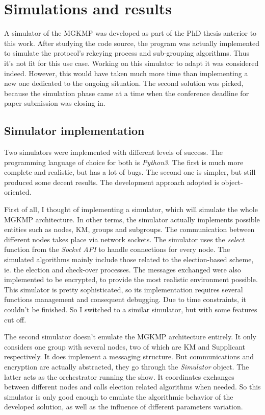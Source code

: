 \section{Simulations and results}
\label{sec:simulations_results}

A simulator of the MGKMP was developed as part of the PhD thesis \cite{kandi_lightweight_nodate} anterior to this work. After studying the code source, the program was actually implemented to simulate the protocol's rekeying process and sub-grouping algorithms. Thus it's not fit for this use case. Working on this simulator to adapt it was considered indeed. However, this would have taken much more time than implementing a new one dedicated to the ongoing situation. The second solution was picked, because the simulation phase came at a time when the conference deadline for paper submission was closing in.

\subsection{Simulator implementation}

Two simulators were implemented with different levels of success. The programming language of choice for both is \emph{Python3}. The first is much more complete and realistic, but has a lot of bugs. The second one is simpler, but still produced some decent results. The development approach adopted is object-oriented.

First of all, I thought of implementing a simulator, which will simulate the whole MGKMP architecture. In other terms, the simulator actually implements possible entities such as nodes, KM, groups and subgroups. The communication between different nodes takes place via network sockets. The simulator uses the \emph{select} function from the \emph{Socket API} to handle connections for every node. The simulated algorithms mainly include those related to the election-based scheme, ie. the election and  check-over processes. The messages exchanged were also implemented to be encrypted, to provide the most realistic environment possible. This simulator is pretty sophisticated, so its implementation requires several functions management and consequent debugging. Due to time constraints, it couldn't be finished. So I switched to a similar simulator, but with some features cut off.

The second simulator doesn't emulate the MGKMP architecture entirely. It only considers one group with several nodes, two of which are KM and Supplicant respectively. It does implement a messaging structure. But communications and encryption are actually abstracted, they go through the \emph{Simulator} object. The latter acts as the orchestrator running the show. It coordinates exchanges between different nodes and calls election related algorithms when needed. So this simulator is only good enough to emulate the algorithmic behavior of the developed solution, as well as the influence of different parameters variation.


